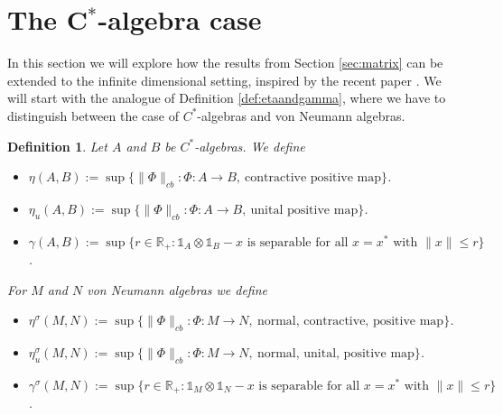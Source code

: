 \documentclass[11pt]{article}
\numberwithin{theorem}{section}
\newtheorem{definition}[theorem]{Definition}
\begin{document}
\section{The C$^*$-algebra case}
In this section we will explore how the results from Section \ref{sec:matrix} can be extended to the infinite dimensional setting, inspired by the recent paper \cite{MusatRordam}. We will start with the analogue of Definition \ref{def:etaandgamma}, where we have to distinguish between the case of $C^{\ast}$-algebras and von Neumann algebras.
\begin{definition}
Let $A$ and $B$ be $C^{\ast}$-algebras. We define  
\begin{itemize}
    \item $\eta(A, B) :=\sup\{\|\Phi\|_{cb}: \Phi: A\rightarrow B,  \ \text{contractive positive map}\}$.
\item  $\eta_{u}(A, B) :=\sup\{\|\Phi\|_{cb}: \Phi: A\rightarrow B,  \ \text{unital positive map}\}$.
\item $\gamma(A, B) := \sup\{r \in \mathbb{R}_{+}: \mathds{1}_A \otimes \mathds{1}_B - x \text{ is separable for all } x=x^{\ast}\text{ with }\|x\|\leqslant r\}$.
\end{itemize}
For $M$ and $N$ von Neumann algebras we define
\begin{itemize}
    \item $\eta^{\sigma}(M, N) :=\sup\{\|\Phi\|_{cb}: \Phi: M\rightarrow N,  \ \text{normal, contractive, positive map}\}$.
\item  $\eta_{u}^{\sigma}(M, N) :=\sup\{\|\Phi\|_{cb}: \Phi: M\rightarrow N,  \ \text{normal, unital, positive map}\}$.
\item $\gamma^{\sigma}(M, N) := \sup\{r \in \mathbb{R}_{+}: \mathds{1}_M \otimes \mathds{1}_N - x \text{ is separable for all } x=x^{\ast}\text{ with }\|x\|\leqslant r\}$.
\end{itemize}

\end{definition}
\end{document}
